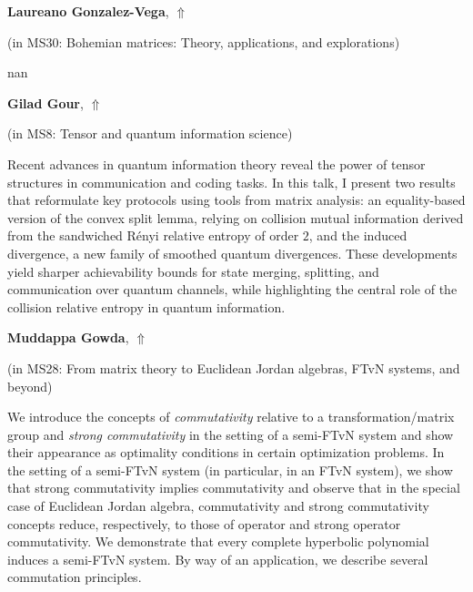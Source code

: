 \documentclass[ILAS2025-program.tex]{subfiles}
\begin{document}
\hypertarget{down0230}{}\begin{ilasabstract}
    
\textbf{Laureano Gonzalez-Vega},  \hfill \hyperlink{up0230}{$\Uparrow$}
    
    
(in {\color{mstitle}MS30: Bohemian matrices: Theory, applications, and explorations})
        
\mtskip
    nan
\end{ilasabstract}
    

\hypertarget{down0053}{}\begin{ilasabstract}
    
\textbf{Gilad Gour},  \hfill \hyperlink{up0053}{$\Uparrow$}
    
    
(in {\color{mstitle}MS8: Tensor and quantum information science})
        
\mtskip
    Recent advances in quantum information theory reveal the power of tensor structures in communication and coding tasks. In this talk, I present two results that reformulate key protocols using tools from matrix analysis: an equality-based version of the convex split lemma, relying on collision mutual information derived from the sandwiched R\'enyi relative entropy of order $2$, and the induced divergence, a new family of smoothed quantum divergences. These developments yield sharper achievability bounds for state merging, splitting, and communication over quantum channels, while highlighting the central role of the collision relative entropy in quantum information.
\end{ilasabstract}
    

\hypertarget{down0384}{}\begin{ilasabstract}
    
\textbf{Muddappa Gowda},  \hfill \hyperlink{up0384}{$\Uparrow$}
    
    
(in {\color{mstitle}MS28: From matrix theory to Euclidean Jordan algebras, FTvN systems, and beyond})
        
\mtskip
    We introduce the concepts of {\it commutativity} relative to a transformation/matrix group and {\it strong commutativity} in the setting of a semi-FTvN system and show their appearance as optimality conditions in certain optimization problems. In the setting of a semi-FTvN system (in particular, in an FTvN system), we show that strong commutativity implies commutativity and observe that in the special case of Euclidean Jordan algebra, commutativity and strong commutativity concepts reduce, respectively, to those of operator and strong operator commutativity. We demonstrate that every complete hyperbolic polynomial induces a semi-FTvN system. By way of an application, we describe several commutation principles. 


\end{ilasabstract}
    
\end{document}
